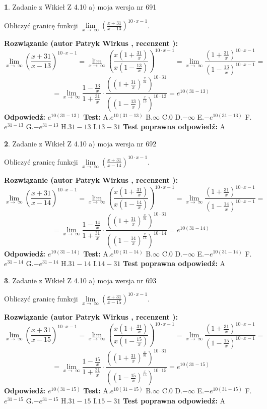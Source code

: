 \documentclass[12pt, a4paper]{article}
\theoremstyle{definition} %
\newtheorem{zad}{}
\newcommand{\zadStart}[1]{\begin{zad}#1\newline}
\newcommand{\zadStop}{\end{zad}}
\newcommand{\rozwStart}[2]{\noindent \textbf{Rozwiązanie (autor #1 , recenzent #2): }\newline}
\newcommand{\rozwStop}{\newline}
\newcommand{\odpStart}{\noindent \textbf{Odpowiedź:}\newline}
\newcommand{\odpStop}{\newline}
\newcommand{\testStart}{\noindent \textbf{Test:}\newline}
\newcommand{\testStop}{\newline}
\newcommand{\kluczStart}{\noindent \textbf{Test poprawna odpowiedź:}\newline}
\newcommand{\kluczStop}{\newline}
\begin{document}
\zadStart{Zadanie z Wikieł Z 4.10 a) moja wersja nr 691}


Obliczyć granicę funkcji  $\lim\limits_{x\to\ \infty}(\frac{x+31}{x-13})^{10\cdot x-1}$.
\zadStop
\rozwStart{Patryk Wirkus}{}
$$\lim\limits_{x\to\ \infty}(\frac{x+31}{x-13})^{10\cdot x-1} = \lim\limits_{x\to\ \infty}(\frac{x(1+\frac{31}{x})}{x(1-\frac{13}{x})})^{10\cdot x-1}=\lim\limits_{x\to\ \infty}\frac{(1+\frac{31}{x})^{10\cdot x-1}}{(1-\frac{13}{x})^{10\cdot x-1}}=$$
$$=\lim\limits_{x\to\ \infty}\frac{1-\frac{13}{x}}{1+\frac{31}{x}}\cdot\frac{((1+\frac{31}{x})^{\frac{x}{31}})^{10\cdot31}}{((1-\frac{13}{x})^{\frac{x}{13}})^{10\cdot13}}=e^{10(31-13)}$$
\rozwStop
\odpStart
$e^{10(31-13)}$
\odpStop
\testStart
A.$e^{10(31-13)}$ B.$\infty$ C.$0$ D.$-\infty$ E.$-e^{10(31-13)}$
F.$e^{31-13}$ G.$-e^{31-13}$
H.$31-13$
I.$13-31$
\testStop
\kluczStart
A
\kluczStop



\zadStart{Zadanie z Wikieł Z 4.10 a) moja wersja nr 692}


Obliczyć granicę funkcji  $\lim\limits_{x\to\ \infty}(\frac{x+31}{x-14})^{10\cdot x-1}$.
\zadStop
\rozwStart{Patryk Wirkus}{}
$$\lim\limits_{x\to\ \infty}(\frac{x+31}{x-14})^{10\cdot x-1} = \lim\limits_{x\to\ \infty}(\frac{x(1+\frac{31}{x})}{x(1-\frac{14}{x})})^{10\cdot x-1}=\lim\limits_{x\to\ \infty}\frac{(1+\frac{31}{x})^{10\cdot x-1}}{(1-\frac{14}{x})^{10\cdot x-1}}=$$
$$=\lim\limits_{x\to\ \infty}\frac{1-\frac{14}{x}}{1+\frac{31}{x}}\cdot\frac{((1+\frac{31}{x})^{\frac{x}{31}})^{10\cdot31}}{((1-\frac{14}{x})^{\frac{x}{14}})^{10\cdot14}}=e^{10(31-14)}$$
\rozwStop
\odpStart
$e^{10(31-14)}$
\odpStop
\testStart
A.$e^{10(31-14)}$ B.$\infty$ C.$0$ D.$-\infty$ E.$-e^{10(31-14)}$
F.$e^{31-14}$ G.$-e^{31-14}$
H.$31-14$
I.$14-31$
\testStop
\kluczStart
A
\kluczStop



\zadStart{Zadanie z Wikieł Z 4.10 a) moja wersja nr 693}


Obliczyć granicę funkcji  $\lim\limits_{x\to\ \infty}(\frac{x+31}{x-15})^{10\cdot x-1}$.
\zadStop
\rozwStart{Patryk Wirkus}{}
$$\lim\limits_{x\to\ \infty}(\frac{x+31}{x-15})^{10\cdot x-1} = \lim\limits_{x\to\ \infty}(\frac{x(1+\frac{31}{x})}{x(1-\frac{15}{x})})^{10\cdot x-1}=\lim\limits_{x\to\ \infty}\frac{(1+\frac{31}{x})^{10\cdot x-1}}{(1-\frac{15}{x})^{10\cdot x-1}}=$$
$$=\lim\limits_{x\to\ \infty}\frac{1-\frac{15}{x}}{1+\frac{31}{x}}\cdot\frac{((1+\frac{31}{x})^{\frac{x}{31}})^{10\cdot31}}{((1-\frac{15}{x})^{\frac{x}{15}})^{10\cdot15}}=e^{10(31-15)}$$
\rozwStop
\odpStart
$e^{10(31-15)}$
\odpStop
\testStart
A.$e^{10(31-15)}$ B.$\infty$ C.$0$ D.$-\infty$ E.$-e^{10(31-15)}$
F.$e^{31-15}$ G.$-e^{31-15}$
H.$31-15$
I.$15-31$
\testStop
\kluczStart
A
\kluczStop
\end{document}
